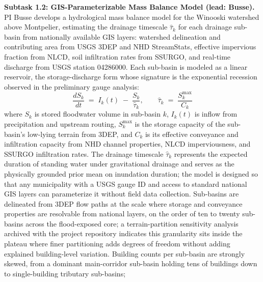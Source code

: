 \documentclass[11pt]{article}
\begin{document}
\textbf{Subtask 1.2: GIS-Parameterizable Mass Balance Model (lead: Busse).}
PI Busse develops a hydrological mass balance model for the Winooski watershed above
Montpelier, estimating the drainage timescale $\hat{\tau}_k$ for each drainage
sub-basin from nationally available GIS layers: watershed delineation and contributing
area from USGS 3DEP and NHD StreamStats, effective impervious fraction from NLCD,
soil infiltration rates from SSURGO, and real-time discharge from USGS station
04286000.
Each sub-basin is modeled as a linear reservoir, the storage-discharge form whose
signature is the exponential recession observed in the preliminary gauge analysis:
\begin{equation}\label{eq:tau}
  \frac{dS_k}{dt} \;=\; I_k(t) \;-\; \frac{S_k}{\hat{\tau}_k},
  \qquad
  \hat{\tau}_k \;=\; \frac{S_k^{\mathrm{max}}}{C_k}
\end{equation}
where $S_k$ is stored floodwater volume in sub-basin $k$, $I_k(t)$ is inflow from
precipitation and upstream routing, $S_k^{\mathrm{max}}$ is the storage capacity
of the sub-basin's low-lying terrain from 3DEP, and $C_k$ is its effective
conveyance and infiltration capacity from NHD channel properties, NLCD
imperviousness, and SSURGO infiltration rates.
The drainage timescale $\hat{\tau}_k$ represents the expected duration of standing
water under gravitational drainage and serves as the physically grounded prior mean
on inundation duration; the model is designed so that any municipality with a USGS
gauge ID and access to standard national GIS layers can parameterize it without
field data collection.
Sub-basins are delineated from 3DEP flow paths at the scale where storage and
conveyance properties are resolvable from national layers, on the order of ten to
twenty sub-basins across the flood-exposed core; a terrain-partition sensitivity
analysis archived with the project repository indicates this granularity sits
inside the plateau where finer partitioning adds degrees of freedom without
adding explained building-level variation.
Building counts per sub-basin are strongly skewed, from a dominant main-corridor
sub-basin holding tens of buildings down to single-building tributary sub-basins;
\end{document}
